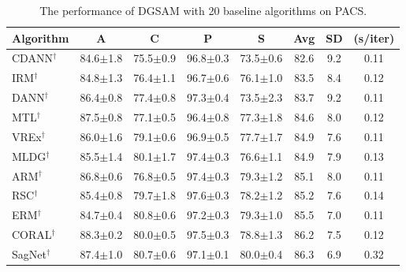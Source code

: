 \documentclass{article}
\theoremstyle{plain}
\theoremstyle{definition}
\theoremstyle{remark}
\begin{document}
\begin{table}[!ht]
\centering
\normalsize
\caption{The performance of DGSAM with 20 baseline algorithms on PACS.}
\begin{tabular}{l|cccc|ccc}
\hline
Algorithm        & A    & C    & P   & S   & Avg   & SD   & (s/iter) \\ \toprule
CDANN\(^\dag\) \cite{li2018cdann}         & {84.6\scriptsize$\pm$1.8} & {75.5\scriptsize$\pm$0.9} & {96.8\scriptsize$\pm$0.3} & {73.5\scriptsize$\pm$0.6} & 82.6 & 9.2  & 0.11 \\
IRM\(^\dag\) \cite{arjovsky2019irm}         & {84.8\scriptsize$\pm$1.3} & {76.4\scriptsize$\pm$1.1} & {96.7\scriptsize$\pm$0.6} & {76.1\scriptsize$\pm$1.0} & 83.5 & 8.4  & 0.12 \\
DANN\(^\dag\) \cite{ganin2016dann}         & {86.4\scriptsize$\pm$0.8} & {77.4\scriptsize$\pm$0.8} & {97.3\scriptsize$\pm$0.4} & {73.5\scriptsize$\pm$2.3} & 83.7 & 9.2  & 0.11 \\
MTL\(^\dag\) \cite{blanchard2021mtl}         & {87.5\scriptsize$\pm$0.8} & {77.1\scriptsize$\pm$0.5} & {96.4\scriptsize$\pm$0.8} & {77.3\scriptsize$\pm$1.8} & 84.6 & 8.0  & 0.12 \\
VREx\(^\dag\) \cite{krueger2021vrex}         & {86.0\scriptsize$\pm$1.6} & {79.1\scriptsize$\pm$0.6} & {96.9\scriptsize$\pm$0.5} & {77.7\scriptsize$\pm$1.7} & 84.9 & 7.6  & 0.11 \\
MLDG\(^\dag\) \cite{li2018mldg}         & {85.5\scriptsize$\pm$1.4} & {80.1\scriptsize$\pm$1.7} & {97.4\scriptsize$\pm$0.3} & {76.6\scriptsize$\pm$1.1} & 84.9 & 7.9  & 0.13 \\
ARM\(^\dag\) \cite{zhang2021arm}         & {86.8\scriptsize$\pm$0.6} & {76.8\scriptsize$\pm$0.5} & {97.4\scriptsize$\pm$0.3} & {79.3\scriptsize$\pm$1.2} & 85.1 & 8.0  & 0.11 \\
RSC\(^\dag\) \cite{huang2020rsc}         & {85.4\scriptsize$\pm$0.8} & {79.7\scriptsize$\pm$1.8} & {97.6\scriptsize$\pm$0.3} & {78.2\scriptsize$\pm$1.2} & 85.2 & 7.6  & 0.14 \\
ERM\(^\dag\)                 & {84.7\scriptsize$\pm$0.4} & {80.8\scriptsize$\pm$0.6} & {97.2\scriptsize$\pm$0.3} & {79.3\scriptsize$\pm$1.0} & 85.5 & 7.0  & 0.11 \\
CORAL\(^\dag\) \cite{sun2016coral}         & {88.3\scriptsize$\pm$0.2} & {80.0\scriptsize$\pm$0.5} & {97.5\scriptsize$\pm$0.3} & {78.8\scriptsize$\pm$1.3} & 86.2 & 7.5  & 0.12 \\
SagNet\(^\dag\) \cite{nam2021sagnet}         & {87.4\scriptsize$\pm$1.0} & {80.7\scriptsize$\pm$0.6} & {97.1\scriptsize$\pm$0.1} & {80.0\scriptsize$\pm$0.4} & 86.3 & 6.9  & 0.32 \\

\end{tabular}
\end{table}
\end{document}
